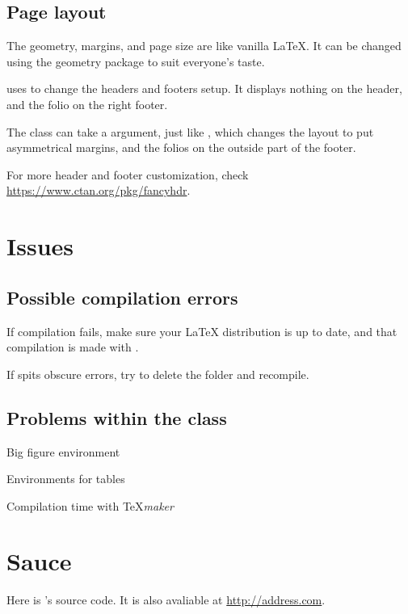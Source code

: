 \documentclass[a4paper, 11pt]{old-dms}
\begin{document}
{{\subsection{Page layout}

The geometry, margins, and page size are like vanilla \LaTeX{}. It can be changed using the geometry package to suit everyone's taste.

 uses  to change the headers and footers setup. It displays nothing on the header, and the folio on the right footer.

The class can take a  argument, just like , which changes the layout to put asymmetrical margins, and the folios on the outside part of the footer.

For more header and footer customization, check \url{https://www.ctan.org/pkg/fancyhdr}.


\section{Issues}
\label{section:issues}


\subsection{Possible compilation errors}

If compilation fails, make sure your \LaTeX{} distribution is up to date, and that compilation is made with .

If  spits obscure errors, try to delete the  folder and recompile.


\subsection{Problems within the class}

Big figure environment

Environments for tables

Compilation time with \TeX\textit{maker}

\newpage


\section{Sauce}

Here is 's source code. It is also avaliable at \url{http://address.com}.

}}
\end{document}
